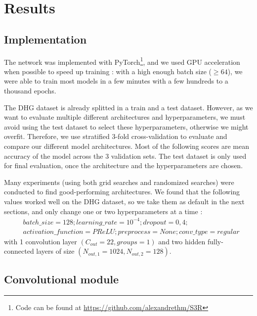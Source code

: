 \documentclass{article}
\begin{document}
\section{Results}

\subsection{Implementation}
The network was implemented with PyTorch\footnote{Code can be found at \url{https://github.com/alexandrethm/S3R}}, and we used GPU acceleration when possible to speed up training : with a high enough batch size ($\geq 64$), we were able to train most models in a few minutes with a few hundreds to a thousand epochs.
\par
The DHG dataset is already splitted in a train and a test dataset. However, as we want to evaluate multiple different architectures and hyperparameters, we must avoid using the test dataset to select these hyperparameters, otherwise we might overfit. 
Therefore, we use stratified 3-fold cross-validation to evaluate and compare our different model architectures. Most of the following scores are mean accuracy of the model across the 3 validation sets.
The test dataset is only used for final evaluation, once the architecture and the hyperparameters are chosen.
\par
Many experiments (using both grid searches and randomized searches) were conducted to find good-performing architectures. We found that the following values worked well on the DHG dataset, so we take them as default in the next sections, and only change one or two hyperparameters at a time :
\begin{equation}
    \begin{aligned}
        & batch\_size=128 ; learning\_rate=10^{-4} ; dropout=0,4; \\
        & activation\_function=PReLU ; preprocess=None ; conv\_type=regular            
    \end{aligned}
\end{equation}
with 1 convolution layer $(C_{out}=22, groups=1)$ and two hidden fully-connected layers of size $(N_{out, 1}=1024, N_{out, 2}=128)$.


\subsection{Convolutional module}
\end{document}
